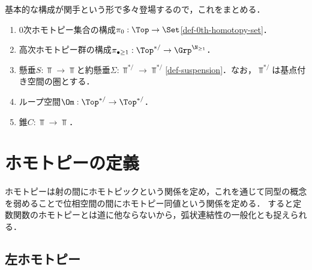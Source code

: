 \documentclass[uplatex, dvipdfmx]{jsreport}
\begin{document}
\begin{notation}[関手]
    基本的な構成が関手という形で多々登場するので，これをまとめる．
    \begin{enumerate}
        \item $0$次ホモトピー集合の構成$\pi_0:\Top\to\Set$\ref{def-0th-homotopy-set}．
        \item 高次ホモトピー群の構成$\pi_{\bullet\ge1}:\Top^{*/}\to\Grp^{\N_{\ge1}}$．
        \item 懸垂$S:\Top\to\Top$と約懸垂$\Sigma:\Top^{*/}\to\Top^{*/}$\ref{def-suspension}．なお，$\Top^{*/}$は基点付き空間の圏とする．
        \item ループ空間$\Om:\Top^{*/}\to\Top^{*/}$．
        \item 錐$C:\Top\to\Top$．
    \end{enumerate}
\end{notation}

\section{ホモトピーの定義}

\begin{tcolorbox}[colframe=ForestGreen, colback=ForestGreen!10!white,breakable,colbacktitle=ForestGreen!40!white,coltitle=black,fonttitle=\bfseries\sffamily,
    title=]
    ホモトピーは射の間にホモトピックという関係を定め，これを通じて同型の概念を弱めることで位相空間の間にホモトピー同値という関係を定める．
    すると定数関数のホモトピーとは道に他ならないから，弧状連結性の一般化とも捉えられる．
\end{tcolorbox}

\subsection{左ホモトピー}
\end{document}
